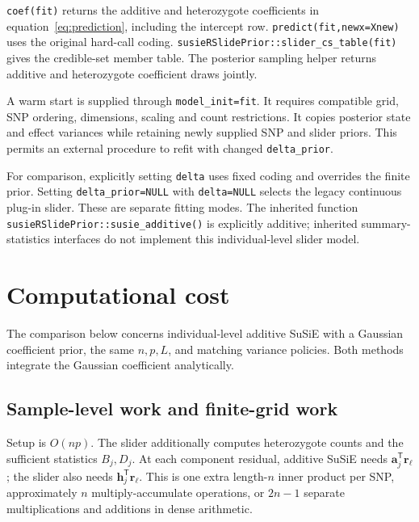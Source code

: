 \documentclass[11pt]{article}
\newcommand{\T}{^{\mathsf T}}
\begin{document}
\texttt{coef(fit)} returns the additive and heterozygote coefficients
in equation~\eqref{eq:prediction}, including the intercept row.
\texttt{predict(fit,newx=Xnew)} uses the original hard-call coding.
\texttt{susieRSlidePrior::slider\_cs\_table(fit)} gives the credible-set
member table. The posterior sampling helper returns additive and
heterozygote coefficient draws jointly.

A warm start is supplied through \texttt{model\_init=fit}. It requires
compatible grid, SNP ordering, dimensions, scaling and count restrictions.
It copies posterior state and effect variances while retaining newly
supplied SNP and slider priors. This permits an external procedure to
refit with changed \texttt{delta\_prior}.

For comparison, explicitly setting \texttt{delta} uses fixed coding and
overrides the finite prior. Setting \texttt{delta\_prior=NULL} with
\texttt{delta=NULL} selects the legacy continuous plug-in slider.
These are separate fitting modes. The inherited function
\texttt{susieRSlidePrior::susie\_additive()} is explicitly additive;
inherited summary-statistics interfaces do not implement this
individual-level slider model.

\section{Computational cost}
\label{sec:cost}
The comparison below concerns individual-level additive SuSiE with a
Gaussian coefficient prior, the same $n,p,L$, and matching variance
policies. Both methods integrate the Gaussian coefficient analytically.

\subsection{Sample-level work and finite-grid work}
Setup is $O(np)$. The slider additionally computes heterozygote counts
and the sufficient statistics $B_j,D_j$. At each component residual,
additive SuSiE needs $\mathbf a_j\T\mathbf r_\ell$; the slider also needs
$\mathbf h_j\T\mathbf r_\ell$. This is one extra length-$n$ inner product
per SNP, approximately $n$ multiply-accumulate operations, or $2n-1$
separate multiplications and additions in dense arithmetic.
\end{document}
